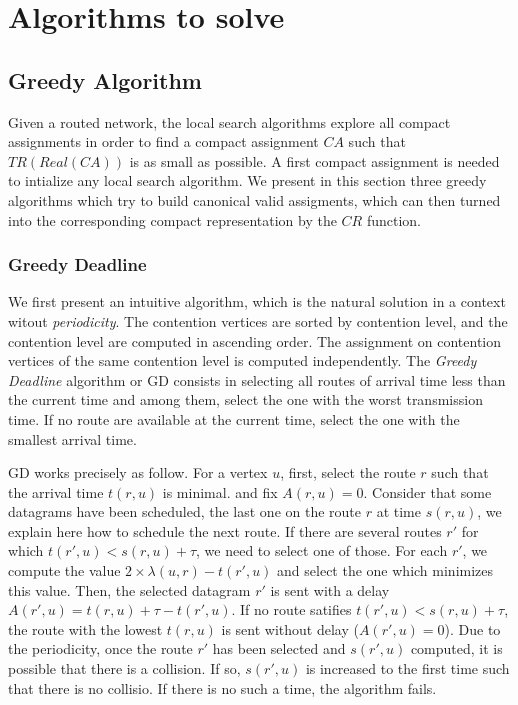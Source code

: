 \documentclass[english]{article}
\begin{document}
\section{Algorithms to solve \spall}


\subsection{Greedy Algorithm}

Given a routed network, the local search algorithms explore all compact assignments in order to find a compact assignment $CA$ such that $TR(Real(CA))$ is as small as possible. A first compact assignment is needed to intialize any local search algorithm. We present in this section three greedy algorithms which try to build canonical valid assigments, which can then 
turned into the corresponding compact representation by the $CR$ function.

\subsubsection{Greedy Deadline}

We first present an intuitive algorithm, which is the natural solution in a context witout \emph{periodicity}.
The contention vertices are sorted by contention level, and the contention level are computed in ascending order. The assignment on contention vertices of the same contention level is computed independently. The \emph{Greedy Deadline} algorithm or GD consists in selecting all routes of arrival time less than the current time and among them,
select the one with the worst transmission time. If no route are available at the current time, select the one with the
smallest arrival time.

GD works precisely as follow. For a vertex $u$, first, select the route $r$ such that the arrival time $t(r,u)$ is minimal. and fix $A(r,u) = 0$.
Consider that some datagrams have been scheduled, the last one on the route $r$ at time $s(r,u)$, we explain here how to schedule the next route.  If there are several routes $r'$ for which $t(r',u) < s(r,u) + \tau $, we need to select one of those. For each $r'$, we compute the value $2\times \lambda(u,r) - t(r',u)$ and select the one which minimizes this value. Then, the selected datagram $r'$ is sent with a delay $A(r',u) = t(r,u) + \tau - t(r',u)$. If no route satifies $t(r',u) < s(r,u) + \tau$, the route with the lowest $t(r,u)$ is sent without delay ($A(r',u) = 0$). 
Due to the periodicity, once the route $r'$ has been selected and $s(r',u)$ computed, it is possible that there is a collision. If so, $s(r',u)$ is increased to the first time such that there is no collisio. If there is no such a time, the algorithm fails.
\end{document}

